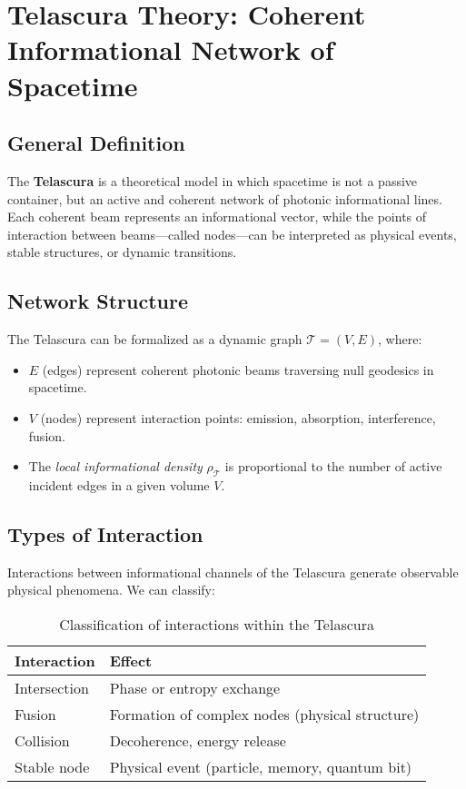\documentclass[12pt]{article}
\begin{document}
\section{Telascura Theory: Coherent Informational Network of Spacetime}

\subsection*{General Definition}
The \textbf{Telascura} is a theoretical model in which spacetime is not a passive container, but an active and coherent network of photonic informational lines. Each coherent beam represents an informational vector, while the points of interaction between beams—called nodes—can be interpreted as physical events, stable structures, or dynamic transitions.

\subsection*{Network Structure}
The Telascura can be formalized as a dynamic graph $\mathcal{T} = (V, E)$, where:
\begin{itemize}
    \item $E$ (edges) represent coherent photonic beams traversing null geodesics in spacetime.
    \item $V$ (nodes) represent interaction points: emission, absorption, interference, fusion.
    \item The \textit{local informational density} $\rho_{\mathcal{T}}$ is proportional to the number of active incident edges in a given volume $V$.
\end{itemize}

\subsection*{Types of Interaction}
Interactions between informational channels of the Telascura generate observable physical phenomena. We can classify:

\begin{table}[h!]
\centering
\begin{tabular}{|l|l|}
\hline
\textbf{Interaction} & \textbf{Effect} \\
\hline
Intersection & Phase or entropy exchange \\
Fusion & Formation of complex nodes (physical structure) \\
Collision & Decoherence, energy release \\
Stable node & Physical event (particle, memory, quantum bit) \\
\hline
\end{tabular}
\caption{Classification of interactions within the Telascura}
\end{table}
\end{document}
